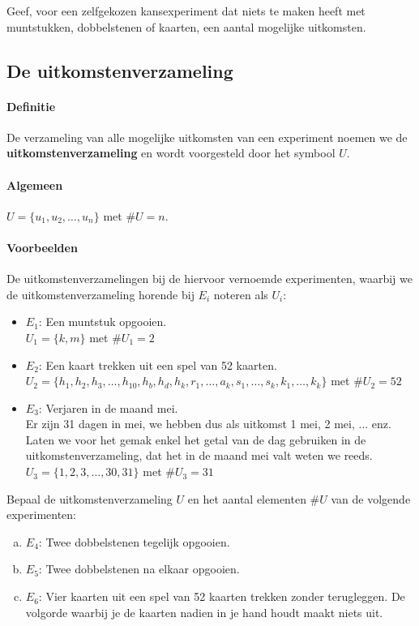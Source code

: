 \documentclass[12pt,a4paper,twoside]{article}
\begin{document}
\begin{oefening}
Geef, voor een zelfgekozen kansexperiment dat niets te maken heeft met muntstukken, dobbelstenen of kaarten, een aantal mogelijke uitkomsten.
\end{oefening}

\subsection{De uitkomstenverzameling}

\paragraph*{Definitie}
De verzameling van alle mogelijke uitkomsten van een experiment noemen we de
{\bf uitkomstenverzameling} en wordt voorgesteld door het symbool $U$.

\paragraph*{Algemeen}
$U=\{u_1, u_2, \ldots, u_n\}$ met $\#U=n$.

\paragraph*{Voorbeelden} De uitkomstenverzamelingen bij de hiervoor vernoemde experimenten, waarbij we de uitkomstenverzameling horende bij $E_i$ noteren als $U_i$:
\begin{itemize}
  \item $E_1$: Een muntstuk opgooien.\\
  $U_1 = \{k,m\}$ met $\#U_1=2$
  \item $E_2$: Een kaart trekken uit een spel van 52 kaarten.\\
  $U_2 = \{h_1, h_2, h_3, \ldots , h_{10}, h_b, h_d, h_k, r_1, \ldots, a_k, s_1, \ldots, s_k, k_1, \ldots, k_k \}$ met $\#U_2=52$
  \item $E_3$: Verjaren in de maand mei.\\
  Er zijn 31 dagen in mei, we hebben dus als uitkomst 1 mei, 2 mei, ... enz. Laten we voor het gemak enkel het getal van de dag gebruiken in de uitkomstenverzameling, dat het in de maand mei valt weten we reeds.\\
  $U_3 = \{1, 2, 3, \ldots, 30, 31\}$ met $\#U_3=31$
\end{itemize}

\begin{oefening}
Bepaal de uitkomstenverzameling $U$ en het aantal elementen $\#U$ van de volgende experimenten:
\begin{enumerate}[(a)]
  \item $E_4$: Twee dobbelstenen tegelijk opgooien.
  \item $E_5$: Twee dobbelstenen na elkaar opgooien.
  \item $E_6$: Vier kaarten uit een spel van 52 kaarten trekken zonder terugleggen. De volgorde waarbij je de kaarten nadien in je hand houdt maakt niets uit.
\end{enumerate}
\end{oefening}
\end{document}
